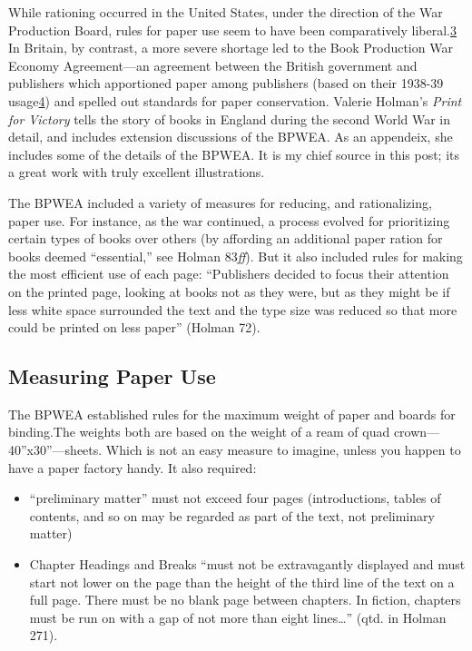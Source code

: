 \documentclass[
  12pt,
]{article}
\providecommand{\tightlist}{%
  \setlength{\itemsep}{0pt}\setlength{\parskip}{0pt}}
\begin{document}
While rationing occurred in the United States, under the direction of
the War Production Board, rules for paper use seem to have been
comparatively liberal.\protect\hyperlink{tvh-footnote3}{3} In Britain,
by contrast, a more severe shortage led to the Book Production War
Economy Agreement---an agreement between the British government and
publishers which apportioned paper among publishers (based on their
1938-39 usage\protect\hyperlink{tvh-footnote4}{4}) and spelled out
standards for paper conservation. {Valerie Holman's \emph{Print for
Victory} tells the story of books in England during the second World War
in detail, and includes extension discussions of the BPWEA. As an
appendeix, she includes some of the details of the BPWEA. It is my chief
source in this post; its a great work with truly excellent
illustrations.}

The BPWEA included a variety of measures for reducing, and
rationalizing, paper use. For instance, as the war continued, a process
evolved for prioritizing certain types of books over others (by
affording an additional paper ration for books deemed ``essential,'' see
Holman 83\emph{ff}). But it also included rules for making the most
efficient use of each page: ``Publishers decided to focus their
attention on the printed page, looking at books not as they were, but as
they might be if less white space surrounded the text and the type size
was reduced so that more could be printed on less paper'' (Holman 72).

\hypertarget{measuring-paper-use}{%
\subsection{Measuring Paper Use}\label{measuring-paper-use}}

The BPWEA established rules for the maximum weight of paper and boards
for binding.{The weights both are based on the weight of a ream of quad
crown---40''x30''---sheets. Which is not an easy measure to imagine,
unless you happen to have a paper factory handy.} It also required:

\begin{itemize}
\tightlist
\item
  ``preliminary matter'' must not exceed four pages (introductions,
  tables of contents, and so on may be regarded as part of the text, not
  preliminary matter)
\item
  Chapter Headings and Breaks ``must not be extravagantly displayed and
  must start not lower on the page than the height of the third line of
  the text on a full page. There must be no blank page between chapters.
  In fiction, chapters must be run on with a gap of not more than eight
  lines\ldots{}'' (qtd. in Holman 271).
\end{itemize}
\end{document}
